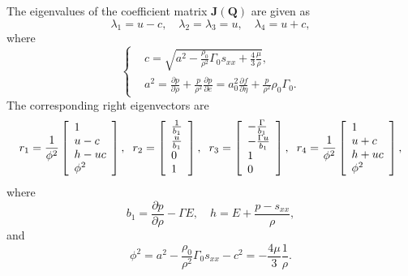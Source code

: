\documentclass[review]{elsarticle}
\begin{document}
The eigenvalues of the coefficient matrix $\mathbf{J}(\mathbf{Q})$ are given as
\begin{equation}
  \lambda_1 = u-c, \quad \lambda_2 =\lambda_3= u, \quad  \lambda_4 = u+c,
\end{equation}
where
\begin{equation}
  \left\{ \begin{aligned}
      & c = \sqrt{a^2-\frac{\rho_0}{\rho^2}\Gamma_0 s_{xx} +\frac{4}{3}\frac{\mu}{\rho}},\\
    &   a^2 = \frac{\partial p}{\partial \rho} + \frac{p}{\rho^2}\frac{\partial p}{\partial e} = a^2_0 \frac{\partial f}{\partial \eta} + \frac{p}{\rho^2}\rho_0 \Gamma_0.
      \end{aligned} \right.
    \end{equation}
The corresponding right eigenvectors are
\begin{equation}\label{eq:eiv}
r_1 =   \frac{1}{\phi^2}\left[\begin{array}{l}
        1 \\
        u-c \\
        h -uc \\
        \phi^2
      \end{array}
    \right], \hspace{0.2cm}
  r_2 = \left[ \begin{array}{l}
      \frac{1}{b_1} \\
      \frac{u}{b_1} \\
      0 \\
      1 \\
    \end{array}
    \right], \hspace{0.2cm}
    r_3= \left[ \begin{array}{l}
        -\frac{\Gamma}{b_1} \\
        -\frac{\Gamma u}{b_1} \\
        1 \\
        0\\
      \end{array}
    \right], \hspace{0.2cm}
r_4 = \frac{1}{\phi^2}\left[\begin{array}{l}
        1 \\
        u+c \\
        h +uc \\
        \phi^2
      \end{array}
    \right],
  \end{equation}
  where
  \begin{equation}
    b_1 = \frac{\partial p}{\partial \rho} - \Gamma E,  \quad h = E +\frac{p-s_{xx}}{\rho},
  \end{equation}
  and
  \begin{equation}
    \phi^2 = a^2 -\frac{\rho_0}{\rho^2} \Gamma_0 s_{xx}-c^2 = -\frac{4\mu}{3}\frac{1}{\rho}.
  \end{equation}
\end{document}
